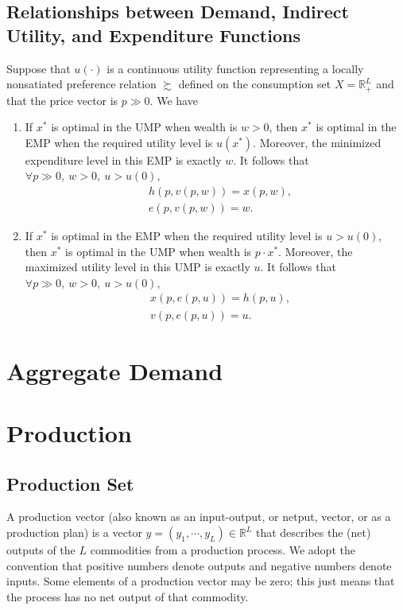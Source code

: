 \documentclass[12pt,fleqn]{book} %
\begin{document}
\section{Relationships between Demand, Indirect Utility,
	and Expenditure Functions}
\begin{proposition}
	Suppose that $u(\cdot)$ is a continuous utility function representing a locally nonsatiated preference relation $\succsim$ defined on the consumption set $X=\mathbb{R}_+^L$ and that the price vector is $p \gg 0$. We have
	\begin{enumerate}
		\item  If $x^*$ is optimal in the UMP when wealth is $w > 0$, then $x^*$ is optimal in the
		EMP when the required utility level is $u(x^*)$. Moreover, the minimized	expenditure level in this EMP is exactly $w$. It follows that $\forall p\gg0,\ w>0,\ u>u(0)$,
		\begin{align*}
			&h(p,v(p,w))=x(p,w),\\
			&e(p,v(p,w))=w.
		\end{align*}
		
		\item If $x^*$ is optimal in the EMP when the required utility level is $u > u(0)$, then $x^*$ is optimal in the UMP when wealth is $p\cdot x^*$. Moreover, the maximized utility level in this UMP is exactly $u$. It follows that $\forall p\gg0,\ w>0,\ u>u(0)$,
		\begin{align*}
		&x(p,e(p,u))=h(p,u),\\
		&v(p,e(p,u))=u.
		\end{align*}
	\end{enumerate}

	
\end{proposition}

\chapter{Aggregate Demand}

\chapter{Production}

\section{Production Set}
A production vector (also known as an input-output, or netput, vector, or as a production plan) is a vector $y = (y_1,\cdots ,y_L)\in\mathbb{R}^L$ that describes the (net) outputs of the $L$ commodities from a production process. We adopt the convention that positive numbers denote outputs and negative numbers denote inputs. Some elements of a production vector may be zero; this just means that the process has no net output of that commodity.
\end{document}
